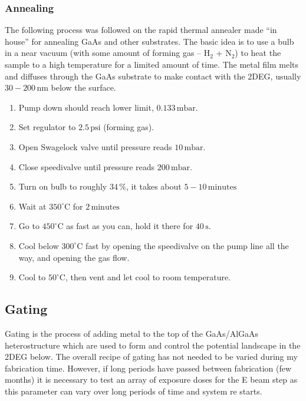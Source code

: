 \subsubsection{Annealing}
The following process was followed on the rapid thermal annealer made “in house” for annealing GaAs and other substrates. The basic idea is to use a bulb in a near vacuum (with some amount of forming gas – $\mathrm{H_2}$ + $\mathrm{N_2}$) to heat the sample to a high temperature for a limited amount of time. The metal film melts and diffuses through the GaAs substrate to make contact with the 2DEG, usually $30-200\,\mathrm{nm}$ below the surface.

\begin{enumerate}
\item Pump down should reach lower limit, $0.133\,\mathrm{mbar}$.
\item Set regulator to $2.5\,\mathrm{psi}$ (forming gas).
\item Open Swagelock valve until pressure reads $10\,\mathrm{mbar}$.
\item Close speedivalve until pressure reads $200\,\mathrm{mbar}$.
\item Turn on bulb to roughly $34\,\%$, it takes about $5-10\,\mathrm{minutes}$
\item Wait at $350^\circ$C for $2\,\mathrm{minutes}$
\item Go to $450^\circ$C as fast as you can, hold it there for $40\,\mathrm{s}$.
\item Cool below $300^\circ$C fast by opening the speedivalve on the pump line all the way, and opening the gas flow.
\item Cool to $50^\circ$C, then vent and let cool to room temperature.
\end{enumerate}


\subsection{Gating}

Gating is the process of adding metal to the top of the GaAs/AlGaAs heterostructure which are used to form and control the potential landscape in the 2DEG below. The overall recipe of gating has not needed to be varied during my fabrication time. However, if long periods have passed between fabrication (few months) it is necessary to test an array of exposure doses for the E beam step as this parameter can vary over long periods of time and system re starts.





